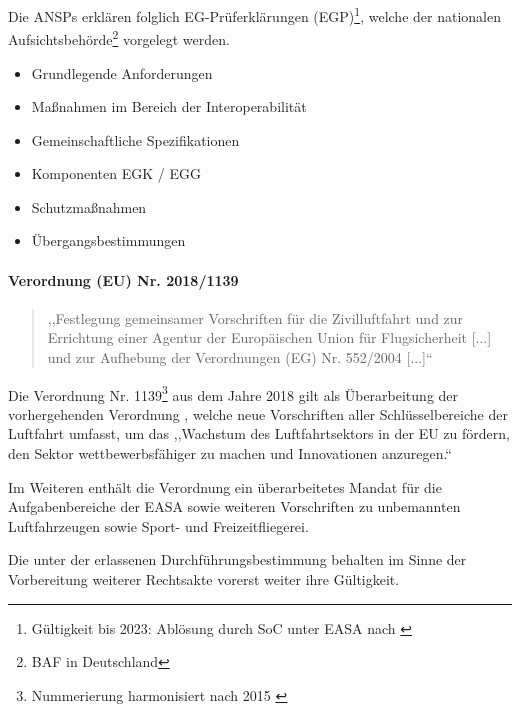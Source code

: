 Die \acp{ANSP} erklären folglich \acs{EG}-Prüferklärungen (\acs{EGP})\footnote{Gültigkeit bis 2023: Ablösung durch \ac{SoC} unter \acs{EASA} nach  \cite{2023R1769}}, welche der nationalen Aufsichtsbehörde\footnote{\acf{BAF} in Deutschland} vorgelegt werden. \cite[Art. 6 Abs. 1f]{2004R0552}

    \begin{itemize}
        \item Grundlegende Anforderungen
        \item Maßnahmen im Bereich der Interoperabilität
        \item Gemeinschaftliche Spezifikationen
        \item Komponenten \ac{EGK} / \ac{EGG}
        \item Schutzmaßnahmen
        \item Übergangsbestimmungen
    \end{itemize}

\paragraph{Verordnung (EU) Nr. 2018/1139}

\begin{quote}
    ,,Festlegung gemeinsamer Vorschriften für die Zivilluftfahrt und zur Errichtung einer Agentur der Europäischen Union für Flugsicherheit [...] und zur Aufhebung der Verordnungen (EG) Nr. 552/2004 [...]`` \cite{2018R1139} 
\end{quote}

Die Verordnung Nr. 1139\footnote{Nummerierung harmonisiert nach 2015 \cite{eu_number_harmony}} aus dem Jahre 2018 gilt als Überarbeitung der vorhergehenden Verordnung , welche neue Vorschriften aller Schlüsselbereiche der Luftfahrt umfasst, um das ,,Wachstum des Luftfahrtsektors in der \ac{EU} zu fördern, den Sektor wettbewerbsfähiger zu machen und Innovationen anzuregen.`` \cite{2018R1139_summary} 

Im Weiteren enthält die Verordnung ein überarbeitetes Mandat für die Aufgabenbereiche der \acf{EASA} sowie weiteren Vorschriften zu unbemannten Luftfahrzeugen sowie Sport- und Freizeitfliegerei.

Die unter der  erlassenen Durchführungsbestimmung behalten im Sinne der Vorbereitung weiterer Rechtsakte vorerst weiter ihre Gültigkeit. \cite[ErwG. 83]{2018R1139}

    \pagebreak
